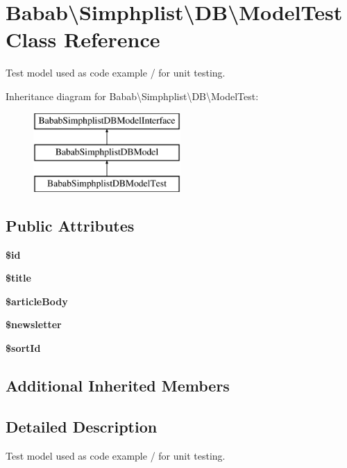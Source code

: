 \hypertarget{classBabab_1_1Simphplist_1_1DB_1_1ModelTest}{\section{Babab\textbackslash{}Simphplist\textbackslash{}D\+B\textbackslash{}Model\+Test Class Reference}
\label{classBabab_1_1Simphplist_1_1DB_1_1ModelTest}
}


Test model used as code example / for unit testing.  


Inheritance diagram for Babab\textbackslash{}Simphplist\textbackslash{}D\+B\textbackslash{}Model\+Test\+:\begin{figure}[H]
\begin{center}
\leavevmode
\includegraphics[height=3.000000cm]{classBabab_1_1Simphplist_1_1DB_1_1ModelTest}
\end{center}
\end{figure}
\subsection*{Public Attributes}
\begin{DoxyCompactItemize}
\item 
{\bfseries \$id}
\item 
{\bfseries \$title}
\item 
{\bfseries \$article\+Body}
\item 
{\bfseries \$newsletter}
\item 
{\bfseries \$sort\+Id}
\end{DoxyCompactItemize}
\subsection*{Additional Inherited Members}


\subsection{Detailed Description}
Test model used as code example / for unit testing. 

